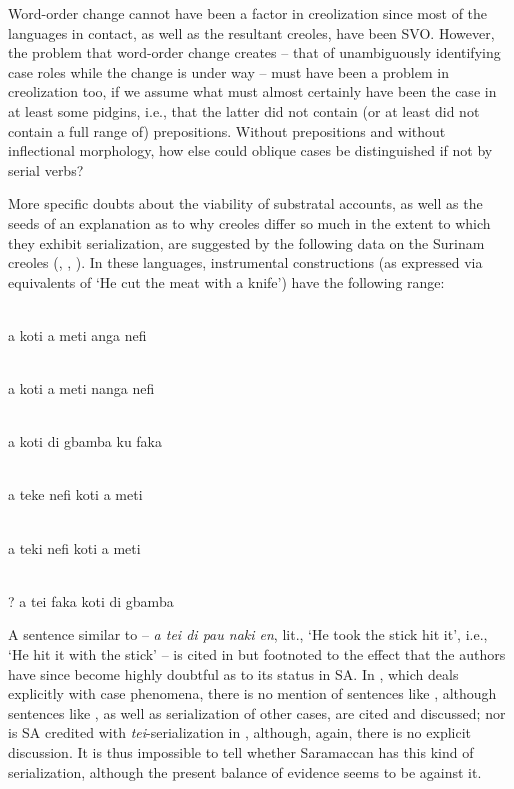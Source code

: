Word-order change cannot have been a factor in creolization since most of the languages in contact, as well as the resultant creoles, have been SVO. However, the problem that word-order change creates --
that of unambiguously identifying case roles while the change is under way -- must have been a problem in creolization too, if we assume what must almost certainly have been the case in at least some pidgins, i.e., that the latter did not contain (or at least did not contain a full range of) prepositions. Without prepositions and without inflectional morphology, how else could oblique cases be distinguished if not by serial verbs?

More specific doubts about the viability of substratal accounts, as well as the seeds of an explanation as to why creoles differ so much in the extent to which they exhibit serialization, are suggested by the following data on the Surinam creoles (, , ). In these languages, instrumental constructions (as expressed via equiva\-lents of `He cut the meat with a knife') have the following range:

\ea\label{ex:2:228}
\ili{\langDJ}{}{}\\
a koti a meti anga nefi
\z

\ea\label{ex:2:229}
\ili{\langSR}{}{}\\
a koti a meti nanga nefi
\z

\ea\label{ex:2:230}
\ili{\langSA}{}{}\\
a koti di gbamba ku faka
\z

\ea\label{ex:2:231}
\ili{\langDJ}{}{}\\
a teke nefi koti a meti
\z

\ea\label{ex:2:232}
\ili{\langSR}{}{}\\
a teki nefi koti a meti
\z

\ea\label{ex:2:233}
\ili{\langSA}{}{}\\
\textnormal{?} a tei faka koti di gbamba
\z

\noindent A sentence similar to  -- \textit{a tei di pau naki en}, lit., `He took the stick hit it', i.e., `He hit it with the stick' -- is cited in \citet{GrimesEtAl1970} but footnoted to the effect that the authors have since become highly doubtful as to its status in SA. In \citet{Glock1972}, which deals explicitly with case phenomena, there is no mention of sentences like , although sentences like , as well as serialization of other cases, are cited and discussed; nor is SA credited with \textit{tei}-serialization in \citet{JansenEtAl1978}, although, again, there is no explicit discussion. It is thus impossible to tell whether Saramaccan has this kind of serialization, although the present balance of evidence seems to be against it.

